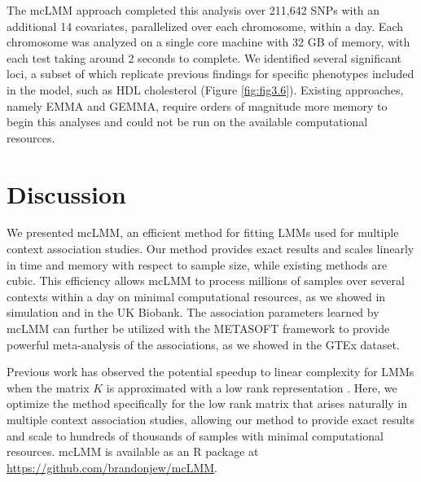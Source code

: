         The mcLMM approach completed this analysis over 211,642 SNPs with an additional 14 covariates, parallelized over each chromosome, within a day. Each chromosome was analyzed on a single core machine with 32 GB of memory, with each test taking around 2 seconds to complete. We identified several significant loci, a subset of which replicate previous findings for specific phenotypes included in the model, such as HDL cholesterol \cite{Wojcik} (Figure \ref{fig:fig3.6}). Existing approaches, namely EMMA and GEMMA, require orders of magnitude more memory to begin this analyses and could not be run on the available computational resources.
    
        
    \section{Discussion}

    We presented mcLMM, an efficient method for fitting LMMs used for multiple context association studies. Our method provides exact results and scales linearly in time and memory with respect to sample size, while existing methods are cubic. This efficiency allows mcLMM to process millions of samples over several contexts within a day on minimal computational resources, as we showed in simulation and in the UK Biobank. The association parameters learned by mcLMM can further be utilized with the METASOFT framework to provide powerful meta-analysis of the associations, as we showed in the GTEx dataset. 
    
    Previous work has observed the potential speedup to linear complexity for LMMs when the matrix $K$ is approximated with a low rank representation \cite{Lippert2011}. Here, we optimize the method specifically for the low rank matrix that arises naturally in multiple context association studies, allowing our method to provide exact results and scale to hundreds of thousands of samples with minimal computational resources. mcLMM is available as an R package at \url{https://github.com/brandonjew/mcLMM}.